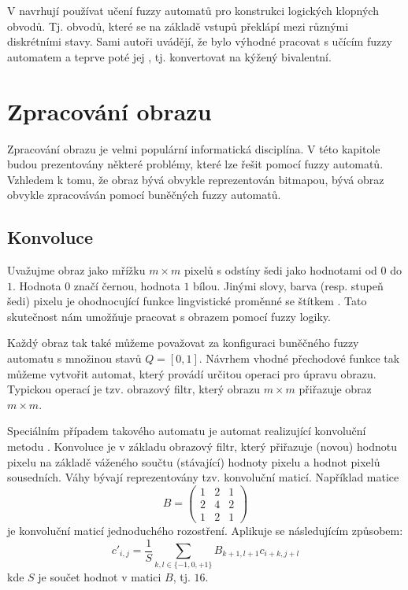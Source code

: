 \documentclass[a4paper,10pt]{article}
\begin{document}
V \cite{PedGac-LeaFuzzAut} navrhují používat učení fuzzy automatů pro konstrukci logických klopných obvodů. Tj. obvodů, které se na základě vstupů překlápí mezi různými diskrétními stavy. Sami autoři uvádějí, že bylo výhodné pracovat s učícím fuzzy automatem a teprve poté jej , tj. konvertovat na kýžený bivalentní.





\section{Zpracování obrazu}
Zpracování obrazu je velmi populární informatická disciplína. V této kapitole budou prezentovány některé problémy, které lze řešit pomocí fuzzy automatů. Vzhledem k tomu, že obraz bývá obvykle reprezentován bitmapou, bývá obraz obvykle zpracováván pomocí buněčných fuzzy automatů.

\subsection{Konvoluce} \label{subs:Convol}
Uvažujme obraz jako mřížku $m \times m$ pixelů s odstíny šedi jako hodnotami od $0$ do $1$. Hodnota $0$ značí černou, hodnota $1$ bílou. Jinými slovy, barva (resp. stupeň šedi) pixelu je ohodnocující funkce lingvistické proměnné se štítkem . Tato skutečnost nám umožňuje pracovat s obrazem pomocí fuzzy logiky.

Každý obraz tak také můžeme považovat za konfiguraci buněčného fuzzy automatu s množinou stavů $Q = [0,1]$. Návrhem vhodné přechodové funkce tak můžeme vytvořit automat, který provádí určitou operaci pro úpravu obrazu. Typickou operací je tzv. obrazový filtr, který obrazu $m \times m$ přiřazuje obraz $m \times m$.

Speciálním případem takového automatu je automat realizující konvoluční metodu \cite{Rus-ImaProHan}. Konvoluce je v základu obrazový filtr, který přiřazuje (novou) hodnotu pixelu na základě váženého součtu (stávající) hodnoty pixelu a hodnot pixelů sousedních. Váhy bývají reprezentovány tzv. konvoluční maticí. Například matice
$$
  B = \begin{pmatrix}
       1 & 2 & 1 \\
       2 & 4 & 2 \\
       1 & 2 & 1 
      \end{pmatrix}
$$
je konvoluční maticí jednoduchého rozostření. Aplikuje se následujícím způsobem:
$$
  c'_{i,j} = \frac{1}{S} \sum_{k,l \in \{-1, 0, +1\}} B_{k+1, l+1} c_{i+k, j+l}
$$
kde $S$ je součet hodnot v matici $B$, tj. $16$.
\end{document}
